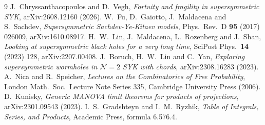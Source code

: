 \documentclass[11pt]{article}
\theoremstyle{remark}
\begin{document}
\begin{thebibliography}{9}\small
{} J.~Chryssanthacopoulos and D.~Vegh, \emph{Fortuity and fragility in supersymmetric SYK}, arXiv:2608.12160 (2026).
 W.~Fu, D.~Gaiotto, J.~Maldacena and S.~Sachdev, \emph{Supersymmetric Sachdev-Ye-Kitaev models}, Phys.\ Rev.\ D \textbf{95} (2017) 026009, arXiv:1610.08917.
 H.~W.~Lin, J.~Maldacena, L.~Rozenberg and J.~Shan, \emph{Looking at supersymmetric black holes for a very long time}, SciPost Phys.\ \textbf{14} (2023) 128, arXiv:2207.00408.
 J.~Boruch, H.~W.~Lin and C.~Yan, \emph{Exploring supersymmetric wormholes in $\mathcal N=2$ SYK with chords}, arXiv:2308.16283 (2023).
 A.~Nica and R.~Speicher, \emph{Lectures on the Combinatorics of Free Probability}, London Math.\ Soc.\ Lecture Note Series 335, Cambridge University Press (2006).
 D.~Kunisky, \emph{Generic MANOVA limit theorems for products of projections}, arXiv:2301.09543 (2023).
 I.~S.~Gradshteyn and I.~M.~Ryzhik, \emph{Table of Integrals, Series, and Products}, Academic Press, formula 6.576.4.
\end{thebibliography}
\end{document}
